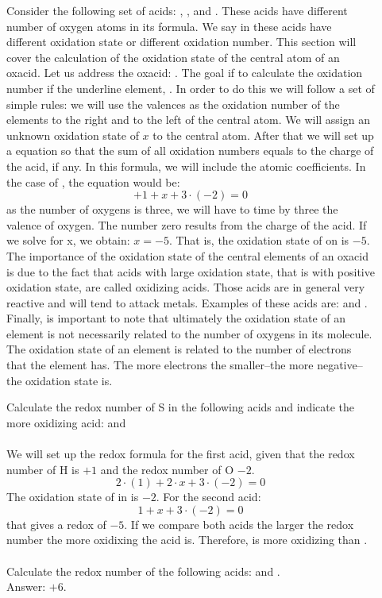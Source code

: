 \documentclass[main.tex]{subfiles}
\begin{document}
\begin{description}
\item[] Consider the following set of acids: , ,  and . These acids have different number of oxygen atoms in its formula. We say  in these acids have different oxidation state or different oxidation number. This section will cover the calculation of the oxidation state of the central atom of an oxacid. Let us address the oxacid: . The goal if to calculate the oxidation number if the underline element, . In order to do this we will follow a set of simple rules: we will use the valences as the oxidation number of the elements to the right and to the left of the central atom. We will assign an unknown oxidation state of $x$ to the central atom. After that we will set up a equation so that the sum of all oxidation numbers equals to the charge of the acid, if any. In this formula, we will include the atomic coefficients. In the case of , the equation would be:
\[+1+x+3\cdot (-2)=0\]
as the number of oxygens is three, we will have to time by three the valence of oxygen. The number zero results from the charge of the acid. If we solve for x, we obtain: $x=-5$. That is, the oxidation state of  on  is $-5$.
The importance of the oxidation state of the central elements of an oxacid is due to the fact that acids with large oxidation state, that is with positive oxidation state, are called oxidizing acids. Those acids are in general very reactive and will tend to attack metals. Examples of these acids are:  and .
Finally, is important to note that ultimately the oxidation state of an element is not necessarily related to the number of oxygens in its molecule. The oxidation state of an element is related to the number of electrons that the element has. The more electrons the smaller--the more negative--the oxidation state is.
\begin{example} %
Calculate the redox number of S in the following acids and indicate the more oxidizing acid:  and \\
\\
We will set up the redox formula for the first acid, given that the redox number of H is $+1$ and the redox number of O $-2$.
\[2\cdot (1)+2\cdot x+3\cdot (-2)=0\]
The oxidation state of  in  is $-2$. For the second acid:
\[1+x+3\cdot (-2)=0\]
that gives a redox of $-5$. If we compare both acids the larger the redox number the more oxidixing the acid is. Therefore,  is more oxidizing than .
\\
\faDiamond\ \\
Calculate the redox number of the following acids:  and .\\
\flushright Answer: $+6$.
\end{example}%


\end{description}
\end{document}
